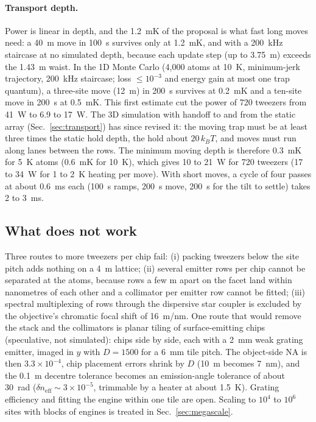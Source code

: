 \paragraph{Transport depth.} Power is linear in depth, and the 1.2~mK of the proposal is what fast long moves
need: a 40~\textmu m move in 100~\textmu s survives only at 1.2~mK, and with a 200~kHz staircase at no simulated
depth, because each update step (up to 3.75~\textmu m) exceeds the 1.43~\textmu m waist. In the 1D Monte Carlo
(4,000 atoms at 10~\textmu K, minimum-jerk trajectory, 200~kHz staircase; loss $\le10^{-3}$ and energy gain at
most one trap quantum), a three-site move (12~\textmu m) in 200~\textmu s survives at 0.2~mK and a ten-site move
in 200~\textmu s at 0.5~mK. This first estimate cut the power of 720 tweezers from 41~W to 6.9 to 17~W. The 3D
simulation with handoff to and from the static array (Sec.~\ref{sec:transport}) has since revised it: the moving
trap must be at least three times the static hold depth, the hold about $20\,k_BT$, and moves must run along
lanes between the rows. The minimum moving depth is therefore 0.3~mK for 5~\textmu K atoms (0.6~mK for
10~\textmu K), which gives 10 to 21~W for 720 tweezers (17 to 34~W for 1 to 2~\textmu K heating per move). With
short moves, a cycle of four passes at about 0.6~ms each (100~\textmu s ramps, 200~\textmu s move, 200~\textmu s
for the tilt to settle) takes 2 to 3~ms.

\subsection{What does not work}\label{sec:moretweezers-not}

Three routes to more tweezers per chip fail: (i) packing tweezers below the site pitch adds nothing on a
4~\textmu m lattice; (ii) several emitter rows per chip cannot be separated at the atoms, because rows a few
\textmu m apart on the facet land within nanometres of each other and a collimator per emitter row cannot be
fitted; (iii) spectral multiplexing of rows through the dispersive star coupler is excluded by the objective's
chromatic focal shift of 16~\textmu m/nm. One route that would remove the stack and the collimators is planar
tiling of surface-emitting chips (speculative, not simulated): chips side by side, each with a 2~mm weak grating
emitter, imaged in $y$ with $D=1500$ for a 6~mm tile pitch. The object-side NA is then $3.3\times10^{-4}$, chip
placement errors shrink by $D$ (10~\textmu m becomes 7~nm), and the 0.1~\textmu m decentre tolerance becomes an
emission-angle tolerance of about 30~\textmu rad ($\delta n_\mathrm{eff}\sim3\times10^{-5}$, trimmable by a heater
at about 1.5~K). Grating efficiency and fitting the engine within one tile are open. Scaling to $10^4$ to $10^6$
sites with blocks of engines is treated in Sec.~\ref{sec:megascale}.
